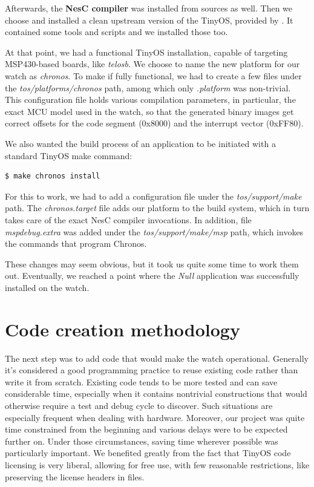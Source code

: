 Afterwards, the {\bf NesC compiler} was installed from sources as well. Then we choose and installed a clean upstream version of the TinyOS, provided by \cite{TOSnet}. It contained some tools and scripts and we installed those too.

At that point, we had a functional TinyOS installation, capable of targeting MSP430-based boards, like \emph{telosb}. We choose to name the new platform for our watch as \emph{chronos}. To make if fully functional, we had to create a few files under the \emph{tos/platforms/chronos} path, among which only \emph{.platform} was non-trivial. This configuration file holds various compilation parameters, in particular, the exact MCU model used in the watch, so that the generated binary images get correct offsets for the code segment (0x8000) and the interrupt vector (0xFF80).

We also wanted the build process of an application to be initiated with a standard TinyOS make command:
\begin{lstlisting}[numbers=none, language=bash]
  $ make chronos install
\end{lstlisting}
For this to work, we had to add a configuration file under the \emph{tos/support/make} path. The \emph{chronos.target} file adds our platform to the build system, which in turn takes care of the exact NesC compiler invocations. In addition, file \emph{mspdebug.extra} was added under the \emph{tos/support/make/msp} path, which invokes the commands that program Chronos.

These changes may seem obvious, but it took us quite some time to work them out. Eventually, we reached a point where the \emph{Null} application was successfully installed on the watch.

\section{Code creation methodology}

The next step was to add code that would make the watch operational. Generally it's considered a good programming practice to reuse existing code rather than write it from scratch. Existing code tends to be more tested and can save considerable time, especially when it contains nontrivial constructions that would otherwise require a test and debug cycle to discover. Such situations are especially frequent when dealing with hardware. Moreover, our project was quite time constrained from the beginning and various delays were to be expected further on. Under those circumstances, saving time wherever possible was particularly important. We benefited greatly from the fact that TinyOS code licensing is very liberal, allowing for free use, with few reasonable restrictions, like preserving the license headers in files.

